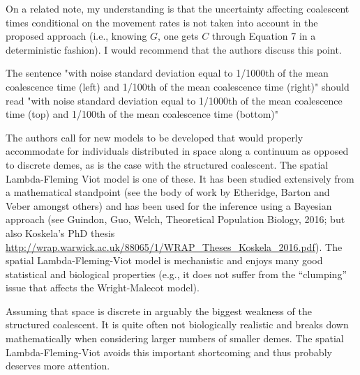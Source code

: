 \begin{point}{}
    On a related note, my understanding is that the uncertainty affecting
    coalescent times conditional on the movement rates is not taken into
    account in the proposed approach (i.e., knowing $G$, one gets $C$ through
    Equation 7 in a deterministic fashion). I would recommend that the authors
    discuss this point.
\end{point}

\reply{
}



\begin{point}{}
    The sentence "with noise standard deviation equal to 1/1000th of the mean
    coalescence time (left) and 1/100th of the mean coalescence time (right)"
    should read "with noise standard deviation equal to 1/1000th of the mean
    coalescence time (top) and 1/100th of the mean coalescence time (bottom)"
\end{point}

\reply{
}



\begin{point}{}
    The authors call for new models to be developed that would properly accommodate
    for individuals distributed in space along a continuum as opposed to
    discrete demes, as is the case with the structured coalescent. The spatial
    Lambda-Fleming Viot model is one of these. It has been studied extensively
    from a mathematical standpoint (see the body of work by Etheridge, Barton
    and Veber amongst others) and has been used for the inference using a
    Bayesian approach (see Guindon, Guo, Welch, Theoretical Population Biology,
    2016; but also Koskela's PhD thesis
    \url{http://wrap.warwick.ac.uk/88065/1/WRAP_Theses_Koskela_2016.pdf}).  The
    spatial Lambda-Fleming-Viot model is mechanistic and enjoys many good
    statistical and biological properties (e.g., it does not suffer from the
    ``clumping'' issue that affects the Wright-Malecot model).
\end{point}

\reply{
}

\begin{point}{}
    Assuming that space is discrete in arguably the biggest weakness of the structured
    coalescent. It is quite often not biologically realistic and breaks down
    mathematically when considering larger numbers of smaller demes. The
    spatial Lambda-Fleming-Viot avoids this important shortcoming and thus
    probably deserves more attention.
\end{point}

\reply{
}

